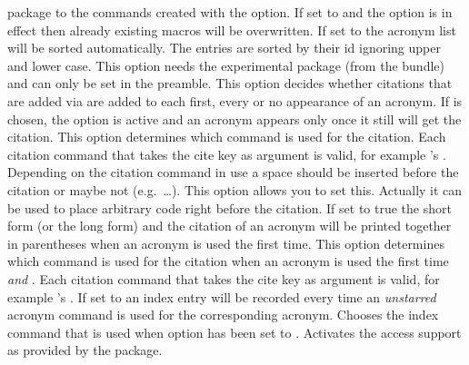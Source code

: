 \documentclass[load-preamble+]{cnltx-doc}
\begin{document}
\begin{options}
     package to the commands created with the 
    option.
    If set to  and the option  is in effect
    then already existing macros will be overwritten.
    If set to  the acronym list will be sorted automatically.  The
    entries are sorted by their \acs{id} ignoring upper and lower case.  This
    option needs the experimental package  (from the
     bundle) and can only be set in the preamble.
    This option decides whether citations that are added
    via  are added to each first, every or no appearance of an
    acronym.  If  is chosen, the option  is
    active and an acronym appears only once it still will get the citation.
    This option determines which command is used for the citation.  Each
    citation command that takes the cite key as argument is valid, for example
    's .
    Depending on the citation command in use a space should be inserted before
    the citation or maybe not (e.g.\ \ldots).  This option
    allows you to set this.  Actually it can be used to place arbitrary code
    right before the citation.
    If set to true the short form (or the long form) and the
    citation of an acronym will be printed together in parentheses when an
    acronym is used the first time.
    This option determines which command is used for the
    citation when an acronym is used the first time \emph{and}
    .  Each citation command that takes the cite
    key as argument is valid, for example 's .
    If set to  an index entry will be recorded every time an
    \emph{unstarred} acronym command is used for the corresponding acronym.
    Chooses the index command that is used when option  has been
    set to .
    Activates the access support as provided by the  package.

\end{options}
\end{document}
